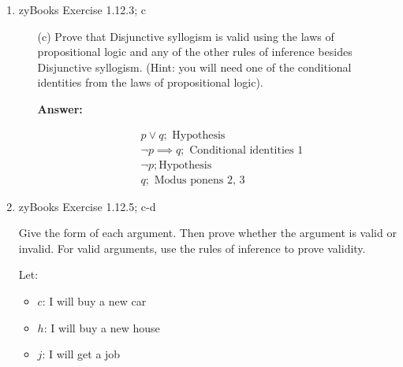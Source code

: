 \documentclass[14pt]{extreport}
\newcommand{\answer}[0]{\medskip \textbf{Answer:} \medskip}
\begin{document}
\begin{enumerate}
\begin{enumerate}
                \answer

                \begin{align}
                    &p \lor q; \text{Hypothesis} \\
                    &\neg p \lor r; \text{Hypothesis} \\
                    &q \lor r; \text{Resolution 1, 2} \\
                    &\neg q; \text{Hypothesis} \\
                    &r; \text{Disjunctive syollogism 3, 4}
                \end{align}

        \end{enumerate}

    \item zyBooks Exercise 1.12.3; c
    
        \begin{enumerate}
            
            \item[(c)] Prove that Disjunctive syllogism is valid using the laws of propositional logic and any of the other rules of inference besides Disjunctive syllogism. (Hint: you will need one of the conditional identities from the laws of propositional logic).
            
                \answer

                \begin{align}
                    & p \lor q; \text{ Hypothesis} \\
                    & \neg p \implies q; \text{ Conditional identities 1} \\
                    & \neg p; \text {Hypothesis} \\
                    & q; \text{ Modus ponens 2, 3}
                \end{align}

        \end{enumerate}

    \item zyBooks Exercise 1.12.5; c-d

    Give the form of each argument. Then prove whether the argument is valid or invalid. For valid arguments, use the rules of inference to prove validity.
    
    Let:
    \begin{itemize}
        \item \( c \): I will buy a new car
        \item \( h \): I will buy a new house
        \item \( j \): I will get a job
    \end{itemize}


\end{enumerate}
\end{document}
